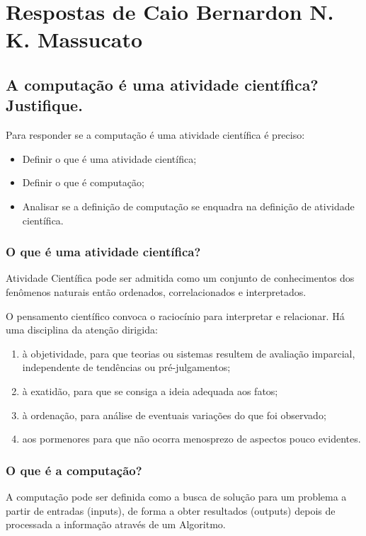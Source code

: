 \section{Respostas de Caio Bernardon N. K. Massucato\label{tarefa-CaioMassucato-componentes-eperimento}}

\subsection{A computação é uma atividade científica? Justifique. }

Para responder se a computação é uma atividade científica é preciso:
\begin{itemize}
    \item Definir o que é uma atividade científica;
    \item Definir o que é computação;
    \item Analisar se a definição de computação se enquadra na definição de atividade científica. 
\end{itemize}

\subsubsection{O que é uma atividade científica?} Atividade Científica pode ser admitida como um conjunto de conhecimentos dos fenômenos naturais então ordenados, correlacionados e interpretados. 

O pensamento científico convoca o raciocínio para interpretar e relacionar. Há uma disciplina da atenção dirigida:

\begin{enumerate}
    \item à objetividade, para que teorias ou sistemas resultem de avaliação imparcial, independente de tendências ou pré-julgamentos;
    \item  à exatidão, para que se consiga a ideia adequada aos fatos;
    \item  à ordenação, para análise de eventuais variações do que foi observado;
    \item aos pormenores para que não ocorra menosprezo de aspectos pouco evidentes.
\end{enumerate}

\subsubsection{O que é a computação?}

A computação pode ser definida como a busca de solução para um problema a partir de entradas (inputs), de forma a obter resultados (outputs) depois de processada a informação através de um \gls{Algoritmo}.

